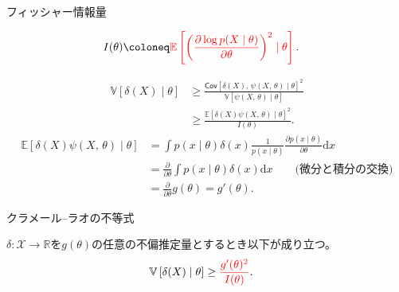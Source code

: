 \documentclass[lualatex,handout]{beamer}
\newcommand{\mycolor}[2]{%
  \begingroup
  \colorlet{currentcolor}{.}%
  \color{#1}#2%
  \color{currentcolor}%
  \endgroup
}
\newcommand{\emm}[1]{\mycolor{red}{#1}}
\newcommand{\expt}[1]{\mathbb{E}\left[#1\right]}
\newcommand{\var}[1]{\mathbb{V}\left[#1\right]}
\newcommand{\cov}[1]{\mathsf{Cov}\left[#1\right]}
\theoremstyle{definition}
\begin{document}
\begin{frame}{フィッシャー情報量}
\small
\begin{definition}[フィッシャー情報量]
\vspace{-1em}
\begin{align*}
I(\theta) &\coloneq \emm{\expt{\left(\frac{\partial \log p(X\mid\theta)}{\partial\theta}\right)^2\mid\theta}}.
\end{align*}
\end{definition}
\begin{align*}
\var{\delta(X)\mid\theta}&\ge\frac{\cov{\delta(X),\,\psi(X,\,\theta)\mid\theta}^2}{\var{\psi(X,\,\theta)\mid\theta}}\\
&\ge\frac{\expt{\delta(X)\psi(X,\,\theta)\mid\theta}^2}{I(\theta)}.
\end{align*}
\begin{align*}
\expt{\delta(X)\psi(X,\,\theta)\mid\theta}&=
\int p(x\mid\theta) \delta(x)\frac1{p(x\mid\theta)}\frac{\partial p(x\mid\theta)}{\partial\theta}\mathrm{d}x\\
&=
\frac{\partial}{\partial\theta}\int p(x\mid\theta) \delta(x)\mathrm{d}x\qquad\text{(微分と積分の交換)}\\
&=
\frac{\partial}{\partial\theta}g(\theta)=g'(\theta).
\end{align*}
\end{frame}

\begin{frame}{クラメール--ラオの不等式}
\begin{theorem}
$\delta\colon\mathcal{X}\to\mathbb{R}$を$g(\theta)$の任意の不偏推定量とするとき以下が成り立つ。
\begin{align*}
\var{\delta(X)\mid\theta} &\ge \emm{\frac{g'(\theta)^2}{I(\theta)}}.
\end{align*}
\end{theorem}
\end{frame}
\end{document}
